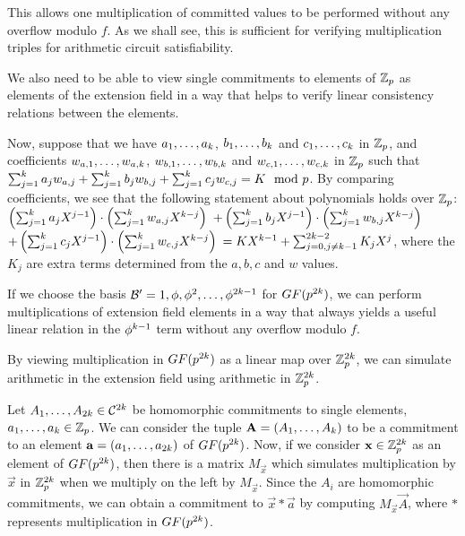 This allows one multiplication of committed values to be performed without any overflow modulo $f$. As we shall see, this is sufficient for verifying multiplication triples for arithmetic circuit satisfiability.

We also need to be able to view single commitments to elements of $\mathbb{Z}_p$ as elements of the extension field in a way that helps to verify linear consistency relations between the elements.

Now, suppose that we have $a_1,\ldots,a_k$, $b_1,\ldots,b_k$ and $c_1,\ldots,c_k$ in $\mathbb{Z}_p$, and coefficients $w_{a,1},\ldots,w_{a,k}$, $w_{b,1},\ldots,w_{b,k}$ and $w_{c,1},\ldots,w_{c,k}$ in $\mathbb{Z}_p$ such that $\sum_{j=1}^k a_j w_{a,j} + \sum_{j=1}^k b_j w_{b,j} + \sum_{j=1}^k c_j w_{c,j} = K\mod {p}$. By comparing coefficients, we see that the following statement about polynomials holds over $\mathbb{Z}_p$:
$\left( \sum_{j=1}^k a_j X^{j-1} \right) \cdot \left( \sum_{j=1}^k w_{a,j} X^{k-j} \right) $ $
+ \left( \sum_{j=1}^k b_j X^{j-1} \right) \cdot \left( \sum_{j=1}^k w_{b,j} X^{k-j} \right) $ $
+ \left( \sum_{j=1}^k c_j X^{j-1} \right) \cdot \left( \sum_{j=1}^k w_{c,j} X^{k-j} \right) $ $
= K X^{k-1} + \sum_{j=0,j\neq k-1}^{2k-2} K_jX^j
$, where the $K_j$ are extra terms determined from the $a,b,c$ and $w$ values.

If we choose the basis $\mathcal{B}' = 1,\phi,\phi^2,\ldots,\phi^{2k-1}$ for $GF(p^{2k})$, we can perform multiplications of extension field elements in a way that always yields a useful linear relation in the $\phi^{k-1}$ term without any overflow modulo $f$.

By viewing multiplication in $GF(p^{2k})$ as a linear map over $\mathbb{Z}_p^{2k}$, we can simulate arithmetic in the extension field using arithmetic in $\mathbb{Z}_p^{2k}$.

Let $A_1,\ldots,A_{2k} \in \mathcal{C}^{2k}$ be homomorphic commitments to single elements, $a_1,\ldots,a_k \in \mathbb{Z}_p$. We can consider the tuple $\mathbf{A} = (A_1,\ldots,A_k)$ to be a commitment to an element $\mathbf{a} = (a_1,\ldots,a_{2k})$ of $GF(p^{2k})$. Now, if we consider $\mathbf{x} \in \mathbb{Z}_p^{2k}$ as an element of $GF(p^{2k})$, then there is a matrix $M_{\vec{x}}$ which simulates multiplication by $\vec{x}$ in $\mathbb{Z}_p^{2k}$ when we multiply on the left by $M_{\vec{x}}$. Since the $A_i$ are homomorphic commitments, we can obtain a commitment to $\vec{x} * \vec{a}$ by computing $M_{\vec{x}} \vec{A}$, where $*$ represents multiplication in $GF(p^{2k})$.

